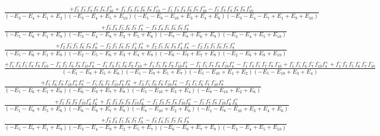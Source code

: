 \documentclass{article}
\begin{document}
\[\begin{array}{rcl}
\frac{+f_{1}^{-}f_{3}^{-}f_{4}^{-}f_{7}^{-}f_{8}^{-}f_{10}^{+}+f_{1}^{-}f_{3}^{-}f_{4}^{-}f_{6}^{-}f_{9}^{-}f_{10}^{+}-f_{1}^{-}f_{3}^{-}f_{4}^{-}f_{6}^{-}f_{7}^{-}f_{10}^{+}-f_{1}^{-}f_{3}^{-}f_{4}^{-}f_{8}^{-}f_{9}^{-}f_{10}^{+}}{(-E_{3}-E_{4}+E_{1}+E_{2})(-E_{3}-E_{4}+E_{5}+E_{10})(-E_{1}-E_{8}-E_{10}+E_{3}+E_{4}+E_{6})(-E_{3}-E_{4}-E_{7}+E_{1}+E_{9}+E_{10})}\\
\frac{+f_{3}^{-}f_{4}^{-}f_{5}^{-}f_{6}^{-}f_{7}^{-}f_{8}^{+}-f_{3}^{-}f_{4}^{-}f_{5}^{-}f_{6}^{-}f_{9}^{-}f_{8}^{+}}{(-E_{5}-E_{6}+E_{1}+E_{8})(-E_{3}-E_{4}-E_{8}+E_{2}+E_{5}+E_{6})(-E_{7}-E_{8}+E_{6}+E_{9})(-E_{3}-E_{4}+E_{5}+E_{10})}\\
\frac{+f_{2}^{-}f_{3}^{-}f_{5}^{-}f_{6}^{-}f_{9}^{-}f_{8}^{+}-f_{2}^{-}f_{5}^{-}f_{6}^{-}f_{7}^{-}f_{4}^{+}f_{8}^{+}+f_{2}^{-}f_{5}^{-}f_{6}^{-}f_{9}^{-}f_{4}^{+}f_{8}^{+}-f_{2}^{-}f_{3}^{-}f_{5}^{-}f_{6}^{-}f_{7}^{-}f_{8}^{+}}{(-E_{5}-E_{6}+E_{1}+E_{8})(-E_{2}-E_{5}-E_{6}+E_{3}+E_{4}+E_{8})(-E_{6}-E_{9}+E_{7}+E_{8})(-E_{2}-E_{6}+E_{8}+E_{10})}\\
\frac{+f_{1}^{-}f_{3}^{-}f_{5}^{-}f_{8}^{-}f_{9}^{-}f_{10}^{-}-f_{1}^{-}f_{5}^{-}f_{6}^{-}f_{9}^{-}f_{10}^{-}f_{4}^{+}-f_{1}^{-}f_{3}^{-}f_{5}^{-}f_{6}^{-}f_{9}^{-}f_{10}^{-}+f_{1}^{-}f_{5}^{-}f_{8}^{-}f_{9}^{-}f_{10}^{-}f_{4}^{+}-f_{1}^{-}f_{5}^{-}f_{7}^{-}f_{8}^{-}f_{10}^{-}f_{4}^{+}-f_{1}^{-}f_{3}^{-}f_{5}^{-}f_{7}^{-}f_{8}^{-}f_{10}^{-}+f_{1}^{-}f_{5}^{-}f_{6}^{-}f_{7}^{-}f_{10}^{-}f_{4}^{+}+f_{1}^{-}f_{3}^{-}f_{5}^{-}f_{6}^{-}f_{7}^{-}f_{10}^{-}}{(-E_{1}-E_{8}+E_{5}+E_{6})(-E_{1}-E_{9}+E_{5}+E_{7})(-E_{5}-E_{10}+E_{1}+E_{2})(-E_{5}-E_{10}+E_{3}+E_{4})}\\
\frac{+f_{5}^{-}f_{6}^{-}f_{9}^{-}f_{10}^{-}f_{4}^{+}f_{8}^{+}-f_{5}^{-}f_{6}^{-}f_{7}^{-}f_{10}^{-}f_{4}^{+}f_{8}^{+}+f_{3}^{-}f_{5}^{-}f_{6}^{-}f_{9}^{-}f_{10}^{-}f_{8}^{+}-f_{3}^{-}f_{5}^{-}f_{6}^{-}f_{7}^{-}f_{10}^{-}f_{8}^{+}}{(-E_{5}-E_{6}+E_{1}+E_{8})(-E_{6}-E_{9}+E_{7}+E_{8})(-E_{5}-E_{10}+E_{3}+E_{4})(-E_{8}-E_{10}+E_{2}+E_{6})}\\
\frac{+f_{1}^{-}f_{8}^{-}f_{9}^{-}f_{10}^{-}f_{4}^{+}f_{6}^{+}+f_{1}^{-}f_{3}^{-}f_{8}^{-}f_{9}^{-}f_{10}^{-}f_{6}^{+}-f_{1}^{-}f_{3}^{-}f_{7}^{-}f_{8}^{-}f_{10}^{-}f_{6}^{+}-f_{1}^{-}f_{7}^{-}f_{8}^{-}f_{10}^{-}f_{4}^{+}f_{6}^{+}}{(-E_{1}-E_{8}+E_{5}+E_{6})(-E_{6}-E_{9}+E_{7}+E_{8})(-E_{8}-E_{10}+E_{2}+E_{6})(-E_{1}-E_{8}-E_{10}+E_{3}+E_{4}+E_{6})}\\
\frac{+f_{3}^{-}f_{4}^{-}f_{5}^{-}f_{6}^{-}f_{7}^{-}f_{9}^{+}-f_{3}^{-}f_{4}^{-}f_{5}^{-}f_{7}^{-}f_{8}^{-}f_{9}^{+}}{(-E_{5}-E_{7}+E_{1}+E_{9})(-E_{3}-E_{4}-E_{9}+E_{2}+E_{5}+E_{7})(-E_{6}-E_{9}+E_{7}+E_{8})(-E_{3}-E_{4}+E_{5}+E_{10})}\\

\end{array}\]
\end{document}
